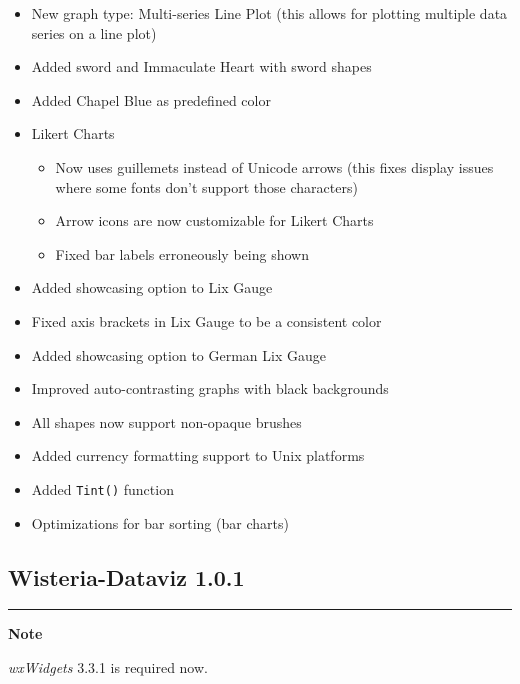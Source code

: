 \documentclass[
]{scrartcl}
\providecommand{\tightlist}{%
  \setlength{\itemsep}{0pt}\setlength{\parskip}{0pt}}
\newenvironment{notesection}
    {
    \begin{tcolorbox}[colframe=mediumblue,colback=lightblue,coltext=mediumblue,arc=3mm]
    \faEdit[regular] \textbf{Note} \newline
    }
    {
    \end{tcolorbox}
    }
\begin{document}
\begin{itemize}
\tightlist
\item
  New graph type: Multi-series Line Plot (this allows for plotting
  multiple data series on a line plot)
\item
  Added sword and Immaculate Heart with sword shapes
\item
  Added Chapel Blue as predefined color
\item
  Likert Charts

  \begin{itemize}
  \tightlist
  \item
    Now uses guillemets instead of Unicode arrows (this fixes display
    issues where some fonts don't support those characters)
  \item
    Arrow icons are now customizable for Likert Charts
  \item
    Fixed bar labels erroneously being shown
  \end{itemize}
\item
  Added showcasing option to Lix Gauge
\item
  Fixed axis brackets in Lix Gauge to be a consistent color
\item
  Added showcasing option to German Lix Gauge
\item
  Improved auto-contrasting graphs with black backgrounds
\item
  All shapes now support non-opaque brushes
\item
  Added currency formatting support to Unix platforms
\item
  Added \texttt{Tint()} function
\item
  Optimizations for bar sorting (bar charts)
\end{itemize}

\subsection*{Wisteria-Dataviz 1.0.1}\label{section-11}

\begin{center}\rule{0.5\linewidth}{0.5pt}\end{center}

\begin{notesection}
\emph{wxWidgets} 3.3.1 is required now.

\end{notesection}
\end{document}
